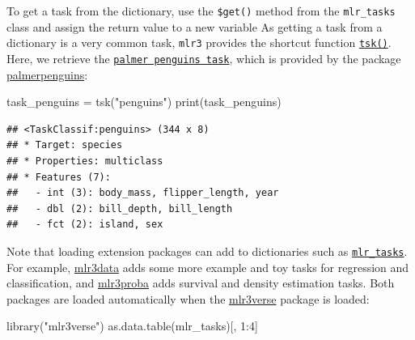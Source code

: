 \documentclass[
]{scrbook}
\newenvironment{Shaded}{\begin{snugshade}}{\end{snugshade}}
\newcommand{\DecValTok}[1]{\textcolor[rgb]{0.00,0.00,0.81}{#1}}
\newcommand{\FunctionTok}[1]{\textcolor[rgb]{0.00,0.00,0.00}{#1}}
\newcommand{\NormalTok}[1]{#1}
\newcommand{\OtherTok}[1]{\textcolor[rgb]{0.56,0.35,0.01}{#1}}
\newcommand{\SpecialCharTok}[1]{\textcolor[rgb]{0.00,0.00,0.00}{#1}}
\newcommand{\StringTok}[1]{\textcolor[rgb]{0.31,0.60,0.02}{#1}}
\renewenvironment{Shaded} {\begin{snugshade}\small} {\end{snugshade}}
\begin{document}
To get a task from the dictionary, use the \texttt{\$get()} method from the \texttt{mlr\_tasks} class and assign the return value to a new variable
As getting a task from a dictionary is a very common task, \texttt{mlr3} provides the shortcut function \href{https://mlr3.mlr-org.com/reference/mlr_sugar.html}{\texttt{tsk()}}.
Here, we retrieve the \href{https://mlr3.mlr-org.com/reference/mlr_tasks_penguins.html}{\texttt{palmer\ penguins\ task}}, which is provided by the package \href{https://cran.r-project.org/package=palmerpenguins}{palmerpenguins}:

\begin{Shaded}
\begin{Highlighting}[]
\NormalTok{task\_penguins }\OtherTok{=} \FunctionTok{tsk}\NormalTok{(}\StringTok{"penguins"}\NormalTok{)}
\FunctionTok{print}\NormalTok{(task\_penguins)}
\end{Highlighting}
\end{Shaded}

\begin{verbatim}
## <TaskClassif:penguins> (344 x 8)
## * Target: species
## * Properties: multiclass
## * Features (7):
##   - int (3): body_mass, flipper_length, year
##   - dbl (2): bill_depth, bill_length
##   - fct (2): island, sex
\end{verbatim}

Note that loading extension packages can add to dictionaries such as \href{https://mlr3.mlr-org.com/reference/mlr_tasks.html}{\texttt{mlr\_tasks}}.
For example, \href{https://mlr3data.mlr-org.com}{mlr3data} adds some more example and toy tasks for regression and classification, and \href{https://mlr3proba.mlr-org.com}{mlr3proba} adds survival and density estimation tasks.
Both packages are loaded automatically when the \href{https://mlr3verse.mlr-org.com}{mlr3verse} package is loaded:

\begin{Shaded}
\begin{Highlighting}[]
\FunctionTok{library}\NormalTok{(}\StringTok{"mlr3verse"}\NormalTok{)}
\FunctionTok{as.data.table}\NormalTok{(mlr\_tasks)[, }\DecValTok{1}\SpecialCharTok{:}\DecValTok{4}\NormalTok{]}
\end{Highlighting}
\end{Shaded}
\end{document}
